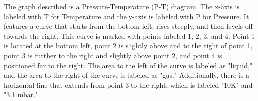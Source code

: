 The graph described is a Pressure-Temperature (P-T) diagram. The x-axis is labeled with T for Temperature and the y-axis is labeled with P for Pressure. It features a curve that starts from the bottom left, rises steeply, and then levels off towards the right. This curve is marked with points labeled 1, 2, 3, and 4. Point 1 is located at the bottom left, point 2 is slightly above and to the right of point 1, point 3 is further to the right and slightly above point 2, and point 4 is positioned far to the right. The area to the left of the curve is labeled as "liquid," and the area to the right of the curve is labeled as "gas." Additionally, there is a horizontal line that extends from point 3 to the right, which is labeled "10K" and "3.1 mbar."